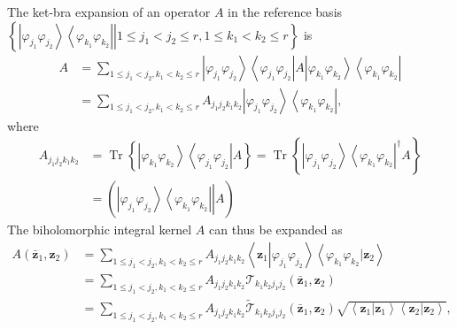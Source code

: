 \documentclass[aps,preprint]{revtex4}%
\begin{document}
The ket-bra expansion of an operator $A$ in the reference basis $\left\{
\left.  \left\vert \varphi_{j_{1}}\varphi_{j_{2}}\right\rangle \left\langle
\varphi_{k_{1}}\varphi_{k_{2}}\right\vert \right\vert 1\leq j_{1}<j_{2}\leq
r,1\leq k_{1}<k_{2}\leq r\right\}  $ is
\begin{align}
A  &  =\sum_{1\leq j_{1}<j_{2},k_{1}<k_{2}\leq r}\left\vert \varphi_{j_{1}%
}\varphi_{j_{2}}\right\rangle \left\langle \varphi_{j_{1}}\varphi_{j_{2}%
}\right\vert A\left\vert \varphi_{k_{1}}\varphi_{k_{2}}\right\rangle
\left\langle \varphi_{k_{1}}\varphi_{k_{2}}\right\vert \nonumber\\
&  =\sum_{1\leq j_{1}<j_{2},k_{1}<k_{2}\leq r}A_{j_{1}j_{2}k_{1}k_{2}%
}\left\vert \varphi_{j_{1}}\varphi_{j_{2}}\right\rangle \left\langle
\varphi_{k_{1}}\varphi_{k_{2}}\right\vert ,
\end{align}
where
\begin{align}
A_{j_{1}j_{2}k_{1}k_{2}}  &  =\operatorname*{Tr}\left\{  \left\vert
\varphi_{k_{1}}\varphi_{k_{2}}\right\rangle \left\langle \varphi_{j_{1}%
}\varphi_{j_{2}}\right\vert A\right\}  =\operatorname*{Tr}\left\{  \left\vert
\varphi_{j_{1}}\varphi_{j_{2}}\right\rangle \left\langle \varphi_{k_{1}%
}\varphi_{k_{2}}\right\vert ^{\dagger}A\right\} \nonumber\\
&  =\left(  \left.  \overset{}{\left\vert \varphi_{j_{1}}\varphi_{j_{2}%
}\right\rangle \left\langle \varphi_{k_{1}}\varphi_{k_{2}}\right\vert
}\right\vert A\right)
\end{align}
The biholomorphic integral kernel $A$ can thus be expanded as
\begin{align}
A\left(  \mathbf{\bar{z}}_{1},\mathbf{z}_{2}\right)   &  =\sum_{1\leq
j_{1}<j_{2},k_{1}<k_{2}\leq r}A_{j_{1}j_{2}k_{1}k_{2}}\left\langle
\mathbf{z}_{1}\left\vert \varphi_{j_{1}}\varphi_{j_{2}}\right.  \right\rangle
\left\langle \varphi_{k_{1}}\varphi_{k_{2}}\left\vert \mathbf{z}_{2}\right.
\right\rangle \nonumber\\
&  =\sum_{1\leq j_{1}<j_{2},k_{1}<k_{2}\leq r}A_{j_{1}j_{2}k_{1}k_{2}%
}\mathcal{T}_{k_{1}k_{2}j_{1}j_{2}}\left(  \mathbf{\bar{z}}_{1},\mathbf{z}%
_{2}\right) \nonumber\\
&  =\sum_{1\leq j_{1}<j_{2},k_{1}<k_{2}\leq r}A_{j_{1}j_{2}k_{1}k_{2}%
}\mathcal{\tilde{T}}_{k_{1}k_{2}j_{1}j_{2}}\left(  \mathbf{\bar{z}}%
_{1},\mathbf{z}_{2}\right)  \sqrt{\left\langle \mathbf{z}_{1}\left\vert
\mathbf{z}_{1}\right.  \right\rangle \left\langle \mathbf{z}_{2}\left\vert
\mathbf{z}_{2}\right.  \right\rangle },
\end{align}
\end{document}
